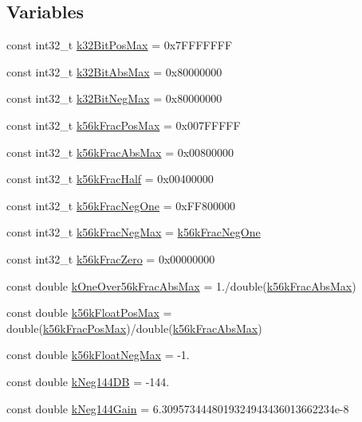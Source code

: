 \subsection*{Variables}
\begin{DoxyCompactItemize}
\item 
const int32\+\_\+t \mbox{\hyperlink{a00449_a6758dcc7fe73efcefb9980ff895c36d0}{k32\+Bit\+Pos\+Max}} = 0x7\+F\+F\+F\+F\+F\+FF
\item 
const int32\+\_\+t \mbox{\hyperlink{a00449_a19c3de953254f182959cb74c9f6ed055}{k32\+Bit\+Abs\+Max}} = 0x80000000
\item 
const int32\+\_\+t \mbox{\hyperlink{a00449_a4623748ef4a22daea8cbbf7557ecb60e}{k32\+Bit\+Neg\+Max}} = 0x80000000
\item 
const int32\+\_\+t \mbox{\hyperlink{a00449_aa1f75eeb19dad78b3045cb5778421b61}{k56k\+Frac\+Pos\+Max}} = 0x007\+F\+F\+F\+FF
\item 
const int32\+\_\+t \mbox{\hyperlink{a00449_ad6054f9b9b26d0b3ee01a6ef097afaea}{k56k\+Frac\+Abs\+Max}} = 0x00800000
\item 
const int32\+\_\+t \mbox{\hyperlink{a00449_a485384e2f324b1666ad9d8600c442d61}{k56k\+Frac\+Half}} = 0x00400000
\item 
const int32\+\_\+t \mbox{\hyperlink{a00449_affbe56efc7321622e3d4c1e2ef60cb28}{k56k\+Frac\+Neg\+One}} = 0x\+F\+F800000
\item 
const int32\+\_\+t \mbox{\hyperlink{a00449_a3306ddeeab535815290a268837e276b1}{k56k\+Frac\+Neg\+Max}} = \mbox{\hyperlink{a00449_affbe56efc7321622e3d4c1e2ef60cb28}{k56k\+Frac\+Neg\+One}}
\item 
const int32\+\_\+t \mbox{\hyperlink{a00449_aeb01246d63cd5b5d1b6c6eb5bcd08b8b}{k56k\+Frac\+Zero}} = 0x00000000
\item 
const double \mbox{\hyperlink{a00449_a5ad86b72eda6b0e72864ec774adad1cf}{k\+One\+Over56k\+Frac\+Abs\+Max}} = 1./double(\mbox{\hyperlink{a00449_ad6054f9b9b26d0b3ee01a6ef097afaea}{k56k\+Frac\+Abs\+Max}})
\item 
const double \mbox{\hyperlink{a00449_abc7ad084f4b51c70feeac700ab05f7a5}{k56k\+Float\+Pos\+Max}} = double(\mbox{\hyperlink{a00449_aa1f75eeb19dad78b3045cb5778421b61}{k56k\+Frac\+Pos\+Max}})/double(\mbox{\hyperlink{a00449_ad6054f9b9b26d0b3ee01a6ef097afaea}{k56k\+Frac\+Abs\+Max}})
\item 
const double \mbox{\hyperlink{a00449_ae1518eaa8f13def92b4c9daeedbbe002}{k56k\+Float\+Neg\+Max}} = -\/1.
\item 
const double \mbox{\hyperlink{a00449_a2381bc3bc0a4c5e07bf67baf7d440137}{k\+Neg144\+DB}} = -\/144.
\item 
const double \mbox{\hyperlink{a00449_a1baf8195909ae1265cbb609e6702d2b4}{k\+Neg144\+Gain}} = 6.\+3095734448019324943436013662234e-\/8
\end{DoxyCompactItemize}


